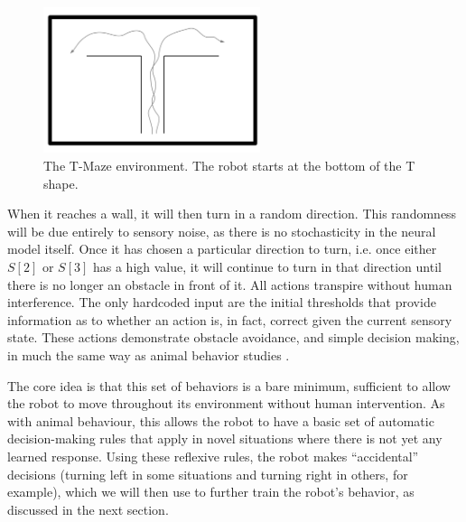 \documentclass[conference]{IEEEtran}
\begin{document}
\begin{figure}[!t]
\centering
\includegraphics[width=2.5in]{tmazeRev.pdf}
\caption{The T-Maze environment. The robot starts at the bottom of the T shape.}
\label{Tmaze}
\end{figure}

When it reaches a wall, it will then turn in a random direction. This randomness will be due 
entirely to sensory noise, as there is no stochasticity in the neural model 
itself. Once it has chosen a particular direction to turn, i.e. once 
either $S[2]$ or $S[3]$ has a high value, it will continue to turn in that 
direction until there is no longer an obstacle in front of it. All actions 
transpire without human interference. The only hardcoded input are the initial 
thresholds that provide information as to whether an action is, in fact, 
correct given the current sensory state. These actions demonstrate obstacle 
avoidance, and simple decision making, in much the same way as animal behavior 
studies  \cite{kim2007encoding}. 

The core idea is that this set of behaviors is a bare minimum, sufficient to
allow the robot to move throughout its environment without human intervention.
As with animal behaviour, this allows the robot to have a basic set of automatic
decision-making rules that apply in novel situations where there is not yet
any learned response.  Using these reflexive rules, the robot makes ``accidental''
decisions (turning left in some situations and turning right in others, for
example), which we will then use to further train the robot's behavior, as
discussed in the next section.
\end{document}
